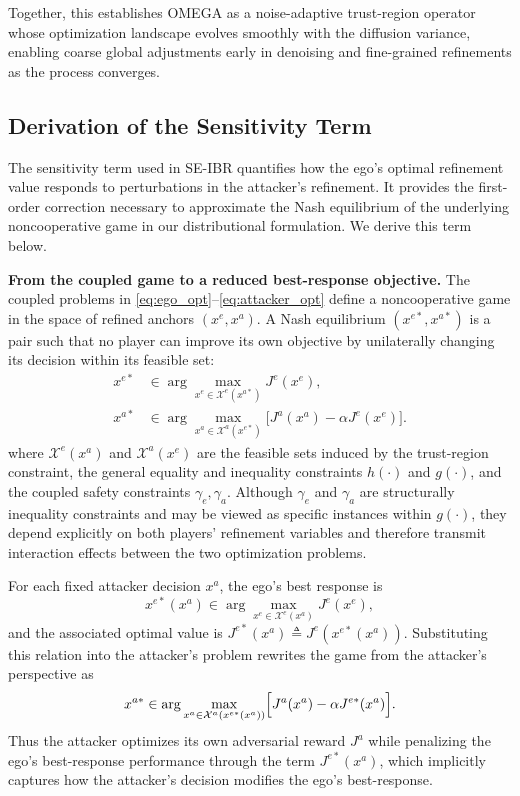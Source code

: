 \documentclass[10pt,twocolumn,letterpaper]{article}
\theoremstyle{plain}
\theoremstyle{remark}
\renewcommand{\paragraph}[1]{\vspace{.5em}\noindent\textbf{#1.}}
\begin{document}
Together, this establishes OMEGA as a noise-adaptive
trust-region operator whose optimization landscape evolves
smoothly with the diffusion variance, enabling coarse global
adjustments early in denoising and fine-grained refinements as
the process converges.

\subsection{Derivation of the Sensitivity Term}
\label{app:sensitivity}

The sensitivity term used in SE-IBR quantifies how the ego’s optimal refinement value responds to perturbations in the attacker’s refinement. It provides the first-order correction necessary to approximate the Nash equilibrium of the underlying noncooperative game in our distributional formulation. We derive this term below.

\vspace{3pt}
\paragraph{From the coupled game to a reduced best-response objective}
The coupled problems in \eqref{eq:ego_opt}--\eqref{eq:attacker_opt}
define a noncooperative game in the space of
refined anchors \((x^e,x^a)\).
A Nash equilibrium \((x^{e*},x^{a*})\) is a pair such that
no player can improve its own objective by unilaterally
changing its decision within its feasible set:
\begin{equation}
\begin{aligned}
x^{e*} &\in 
\arg\max_{x^e \in \mathcal{X}^e(x^{a*})} J^e(x^e), \\
x^{a*} &\in 
\arg\max_{x^a \in \mathcal{X}^a(x^{e*})}
\bigl[J^a(x^a) - \alpha J^e(x^e)\bigr].
\end{aligned}
\label{eq:app_nash}
\end{equation}
where \(\mathcal{X}^e(x^a)\) and \(\mathcal{X}^a(x^e)\) are the
feasible sets induced by the trust-region constraint,
the general equality and inequality constraints
\(h(\cdot)\) and \(g(\cdot)\), and the coupled safety constraints
\(\gamma_e,\gamma_a\). Although \(\gamma_e\) and \(\gamma_a\) are structurally inequality constraints and may be viewed as specific instances within \(g(\cdot)\), they depend explicitly on both players' refinement
variables and therefore transmit interaction effects between the two optimization problems.

For each fixed attacker decision \(x^a\), the ego’s best
response is
\[
x^{e*}(x^a)
\in
\arg\max_{x^e \in \mathcal{X}^e(x^a)} J^e(x^e),
\]
and the associated optimal value is
\(J^{e*}(x^a) \triangleq J^e(x^{e*}(x^a))\).
Substituting this relation into the attacker’s problem rewrites the game from the attacker’s perspective as
\begin{equation}
x^{a*}
\in
\arg\max_{x^a \in \mathcal{X}^a(x^{e*}(x^a))}
\Bigl[J^a(x^a) - \alpha J^{e*}(x^a)\Bigr].
\label{eq:app_reduced_game}
\end{equation}
Thus the attacker optimizes its own adversarial reward \(J^a\)
while penalizing the ego’s best-response performance through
the term \(J^{e*}(x^a)\), which implicitly captures how the attacker’s decision modifies the ego’s best-response.
\end{document}
